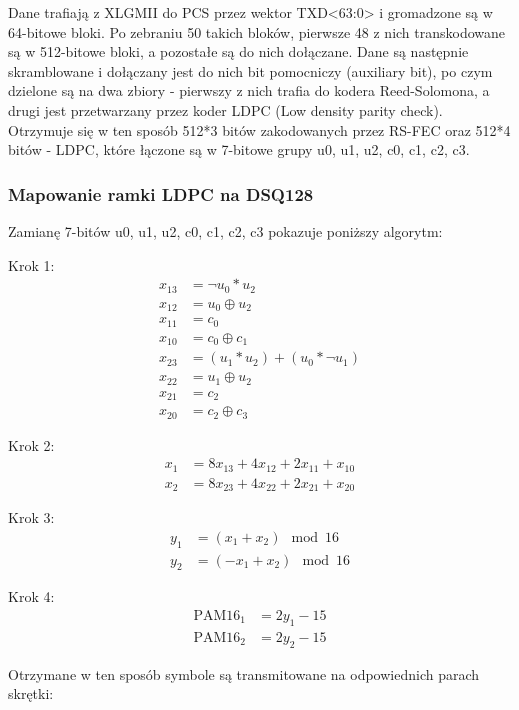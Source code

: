Dane trafiają z XLGMII do PCS przez wektor TXD<63:0> i gromadzone są w 64-bitowe bloki. Po zebraniu 50 takich bloków, pierwsze 48 z nich transkodowane są w 512-bitowe bloki, a pozostałe są do nich dołączane. Dane są następnie skramblowane i dołączany jest do nich bit pomocniczy (auxiliary bit), po czym dzielone są na dwa zbiory - pierwszy z nich trafia do kodera Reed-Solomona, a drugi jest przetwarzany przez koder LDPC (Low density parity check). Otrzymuje się w ten sposób 512*3 bitów zakodowanych przez RS-FEC oraz 512*4 bitów - LDPC, które łączone są w 7-bitowe grupy u0, u1, u2, c0, c1, c2, c3.


\subsubsection{Mapowanie ramki LDPC na DSQ128}
Zamianę 7-bitów u0, u1, u2, c0, c1, c2, c3 pokazuje poniższy algorytm:

Krok 1:
\begin{align*}
    x_{13} &= \neg u_0 * u_2 \\
    x_{12} &= u_0 \oplus u_2 \\
    x_{11} &= c_0 \\
    x_{10} &= c_0 \oplus c_1 \\
    x_{23} &= (u_1 * u_2) + (u_0 * \neg u_1) \\
    x_{22} &= u_1 \oplus u_2 \\
    x_{21} &= c_2 \\
    x_{20} &= c_2 \oplus c_3
\end{align*}

Krok 2:
\begin{align*}
    x_1 &= 8x_{13} + 4x_{12} + 2x_{11} + x_{10} \\
    x_2 &= 8x_{23} + 4x_{22} + 2x_{21} + x_{20}
\end{align*}

Krok 3:
\begin{align*}
    y_1 &= (x_1 + x_2) \mod 16 \\
    y_2 &= (-x_1 + x_2) \mod 16
\end{align*}

Krok 4:
\begin{align*}
    \text{PAM16}_1 &= 2y_1 - 15 \\
    \text{PAM16}_2 &= 2y_2 - 15
\end{align*}

Otrzymane w ten sposób symbole są transmitowane na odpowiednich parach skrętki:

